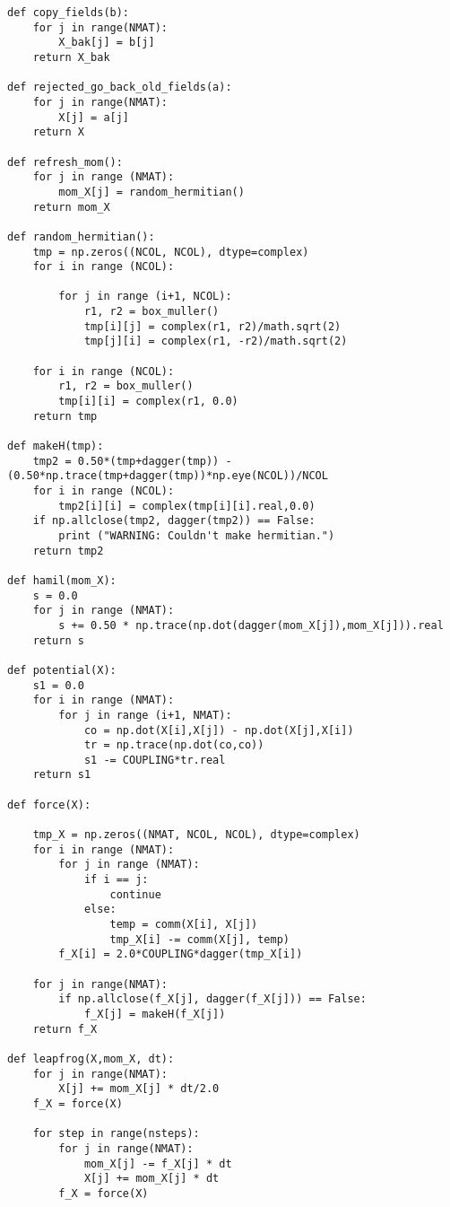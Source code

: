 \begin{lstlisting}
def copy_fields(b):
    for j in range(NMAT):
        X_bak[j] = b[j]
    return X_bak

def rejected_go_back_old_fields(a):
    for j in range(NMAT):
        X[j] = a[j]
    return X

def refresh_mom():
    for j in range (NMAT):
        mom_X[j] = random_hermitian()
    return mom_X

def random_hermitian():
    tmp = np.zeros((NCOL, NCOL), dtype=complex)
    for i in range (NCOL):

        for j in range (i+1, NCOL):
            r1, r2 = box_muller()
            tmp[i][j] = complex(r1, r2)/math.sqrt(2)
            tmp[j][i] = complex(r1, -r2)/math.sqrt(2)

    for i in range (NCOL):
        r1, r2 = box_muller()
        tmp[i][i] = complex(r1, 0.0)
    return tmp 

def makeH(tmp):
    tmp2 = 0.50*(tmp+dagger(tmp)) - (0.50*np.trace(tmp+dagger(tmp))*np.eye(NCOL))/NCOL
    for i in range (NCOL):
        tmp2[i][i] = complex(tmp[i][i].real,0.0)  
    if np.allclose(tmp2, dagger(tmp2)) == False:
        print ("WARNING: Couldn't make hermitian.")
    return tmp2

def hamil(mom_X):
    s = 0.0 
    for j in range (NMAT):
        s += 0.50 * np.trace(np.dot(dagger(mom_X[j]),mom_X[j])).real
    return s    

def potential(X):
    s1 = 0.0 
    for i in range (NMAT):
        for j in range (i+1, NMAT): 
            co = np.dot(X[i],X[j]) - np.dot(X[j],X[i])
            tr = np.trace(np.dot(co,co))
            s1 -= COUPLING*tr.real 
    return s1

def force(X):

    tmp_X = np.zeros((NMAT, NCOL, NCOL), dtype=complex)
    for i in range (NMAT): 
        for j in range (NMAT):
            if i == j:
                continue 
            else:
                temp = comm(X[i], X[j])
                tmp_X[i] -= comm(X[j], temp)
        f_X[i] = 2.0*COUPLING*dagger(tmp_X[i])

    for j in range(NMAT):
        if np.allclose(f_X[j], dagger(f_X[j])) == False:
            f_X[j] = makeH(f_X[j])
    return f_X  

def leapfrog(X,mom_X, dt):
    for j in range(NMAT):
        X[j] += mom_X[j] * dt/2.0
    f_X = force(X)

    for step in range(nsteps):
        for j in range(NMAT):
            mom_X[j] -= f_X[j] * dt
            X[j] += mom_X[j] * dt
        f_X = force(X)


\end{lstlisting}
